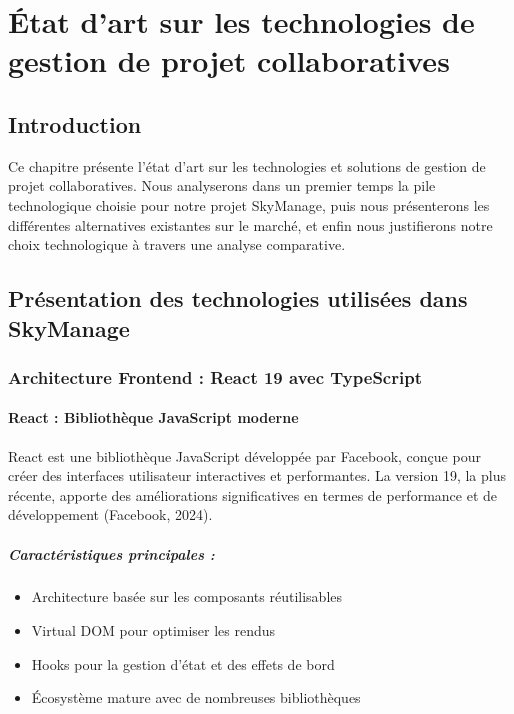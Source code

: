 \chapter{État d'art sur les technologies de gestion de projet collaboratives}

\section{Introduction}

Ce chapitre présente l'état d'art sur les technologies et solutions de gestion de projet collaboratives. Nous analyserons dans un premier temps la pile technologique choisie pour notre projet SkyManage, puis nous présenterons les différentes alternatives existantes sur le marché, et enfin nous justifierons notre choix technologique à travers une analyse comparative.

\section{Présentation des technologies utilisées dans SkyManage}

\subsection{Architecture Frontend : React 19 avec TypeScript}

\subsubsection{React : Bibliothèque JavaScript moderne}
React est une bibliothèque JavaScript développée par Facebook, conçue pour créer des interfaces utilisateur interactives et performantes. La version 19, la plus récente, apporte des améliorations significatives en termes de performance et de développement (Facebook, 2024).

\paragraph{Caractéristiques principales :}
\begin{itemize}
    \item Architecture basée sur les composants réutilisables
    \item Virtual DOM pour optimiser les rendus
    \item Hooks pour la gestion d'état et des effets de bord
    \item Écosystème mature avec de nombreuses bibliothèques
\end{itemize}


